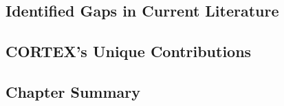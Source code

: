 \subsection{Identified Gaps in Current Literature}

\subsection{CORTEX's Unique Contributions}

\subsection{Chapter Summary}

